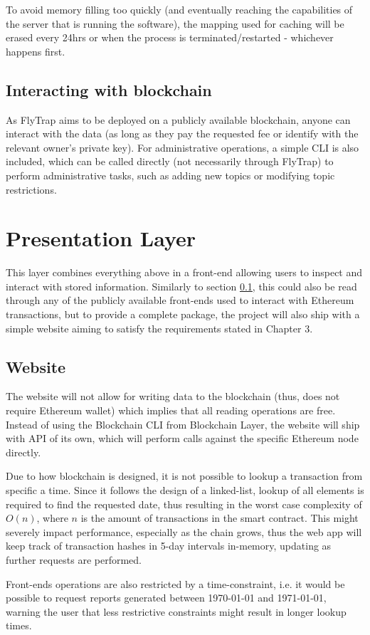 To avoid memory filling too quickly (and eventually reaching the capabilities of the server that is running the software), the mapping used for caching will be erased every 24hrs or when the process is terminated/restarted - whichever happens first.

\subsection{Interacting with blockchain}\label{sec:interact}
As FlyTrap aims to be deployed on a publicly available blockchain, anyone can interact with the data (as long as they pay the requested fee or identify with the relevant owner's private key). For administrative operations, a simple CLI is also included, which can be called directly (not necessarily through FlyTrap) to perform administrative tasks, such as adding new topics or modifying topic restrictions.

\section{Presentation Layer}
This layer combines everything above in a front-end allowing users to inspect and interact with stored information. Similarly to section \ref{sec:interact}, this could also be read through any of the publicly available front-ends used to interact with Ethereum transactions, but to provide a complete package, the project will also ship with a simple website aiming to satisfy the requirements stated in Chapter 3.
\subsection{Website}
The website will not allow for writing data to the blockchain (thus, does not require Ethereum wallet) which implies that all reading operations are free. Instead of using the Blockchain CLI from Blockchain Layer, the website will ship with API of its own, which will perform calls against the specific Ethereum node directly.

Due to how blockchain is designed, it is not possible to lookup a transaction from specific a time. Since it follows the design of a linked-list, lookup of all elements is required to find the requested date, thus resulting in the worst case complexity of $O(n)$, where $n$ is the amount of transactions in the smart contract. This might severely impact performance, especially as the chain grows, thus the web app will keep track of transaction hashes in 5-day intervals in-memory, updating as further requests are performed.

Front-ends operations are also restricted by a time-constraint, i.e. it would be possible to request reports generated between 1970-01-01 and 1971-01-01, warning the user that less restrictive constraints might result in longer lookup times.
